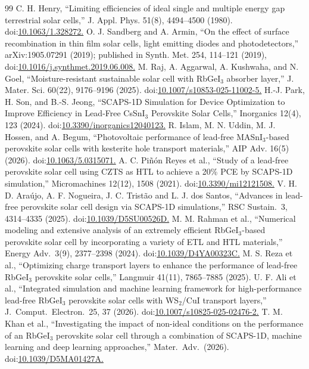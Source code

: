 \documentclass[review]{elsarticle}
\begin{document}
\begin{thebibliography}{99}
 C. H. Henry, ``Limiting efficiencies of ideal single and multiple energy gap terrestrial solar cells,'' J. Appl. Phys. 51(8), 4494--4500 (1980). doi:\url{10.1063/1.328272.}
 O. J. Sandberg and A. Armin, ``On the effect of surface recombination in thin film solar cells, light emitting diodes and photodetectors,'' arXiv:1905.07291 (2019); published in Synth. Met. 254, 114--121 (2019), doi:\url{10.1016/j.synthmet.2019.06.008.}
 M. Raj, A. Aggarwal, A. Kushwaha, and N. Goel, ``Moisture-resistant sustainable solar cell with RbGeI$_{3}$ absorber layer,'' J. Mater. Sci. 60(22), 9176--9196 (2025). doi:\url{10.1007/s10853-025-11002-5.}
 H.-J. Park, H. Son, and B.-S. Jeong, ``SCAPS-1D Simulation for Device Optimization to Improve Efficiency in Lead-Free CsSnI$_{3}$ Perovskite Solar Cells,'' Inorganics 12(4), 123 (2024). doi:\url{10.3390/inorganics12040123.}
 R. Islam, M. N. Uddin, M. J. Hossen, and A. Begum, ``Photovoltaic performance of lead-free MASnI$_{3}$-based perovskite solar cells with kesterite hole transport materials,'' AIP Adv. 16(5) (2026). doi:\url{10.1063/5.0315071.}
 A. C. Piñón Reyes et al., ``Study of a lead-free perovskite solar cell using CZTS as HTL to achieve a 20\% PCE by SCAPS-1D simulation,'' Micromachines 12(12), 1508 (2021). doi:\url{10.3390/mi12121508.}
 V. H. D. Ara\'ujo, A. F. Nogueira, J. C. Trist\~ao and L. J. dos Santos, ``Advances in lead-free perovskite solar cell design via SCAPS-1D simulations,'' RSC Sustain.\ 3, 4314--4335 (2025). doi:\url{10.1039/D5SU00526D.}
 M. M. Rahman et al., ``Numerical modeling and extensive analysis of an extremely efficient RbGeI$_{3}$-based perovskite solar cell by incorporating a variety of ETL and HTL materials,'' Energy Adv.\ 3(9), 2377--2398 (2024). doi:\url{10.1039/D4YA00323C.}
 M. S. Reza et al., ``Optimizing charge transport layers to enhance the performance of lead-free RbGeI$_{3}$ perovskite solar cells,'' Langmuir 41(11), 7865--7885 (2025).
 U. F. Ali et al., ``Integrated simulation and machine learning framework for high-performance lead-free RbGeI$_{3}$ perovskite solar cells with WS$_{2}$/CuI transport layers,'' J.\ Comput.\ Electron.\ 25, 37 (2026). doi:\url{10.1007/s10825-025-02476-2.}
 T. M. Khan et al., ``Investigating the impact of non-ideal conditions on the performance of an RbGeI$_{3}$ perovskite solar cell through a combination of SCAPS-1D, machine learning and deep learning approaches,'' Mater.\ Adv.\ (2026). doi:\url{10.1039/D5MA01427A.}

\end{thebibliography}
\end{document}
